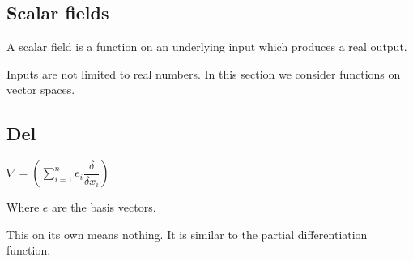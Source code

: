 

\subsection{Scalar fields}

A scalar field is a function on an underlying input which produces a real output.

Inputs are not limited to real numbers. In this section we consider functions on vector spaces.

\subsection{Del}

\(\nabla =(\sum_{i=1}^n e_i\dfrac{\delta }{\delta x_i})\)

Where \(e\) are the basis vectors.

This on its own means nothing. It is similar to the partial differentiation function.

